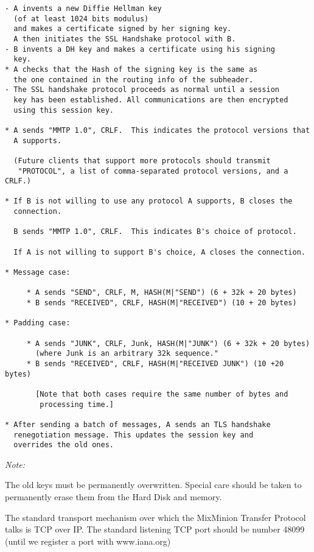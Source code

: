 \begin{verbatim}
- A invents a new Diffie Hellman key 
  (of at least 1024 bits modulus)
  and makes a certificate signed by her signing key.
  A then initiates the SSL Handshake protocol with B.
- B invents a DH key and makes a certificate using his signing
  key.
* A checks that the Hash of the signing key is the same as
  the one contained in the routing info of the subheader.
- The SSL handshake protocol proceeds as normal until a session
  key has been established. All communications are then encrypted
  using this session key.

* A sends "MMTP 1.0", CRLF.  This indicates the protocol versions that
  A supports.

  (Future clients that support more protocols should transmit
   "PROTOCOL", a list of comma-separated protocol versions, and a CRLF.)

* If B is not willing to use any protocol A supports, B closes the 
  connection.

  B sends "MMTP 1.0", CRLF.  This indicates B's choice of protocol.

  If A is not willing to support B's choice, A closes the connection.

* Message case:

     * A sends "SEND", CRLF, M, HASH(M|"SEND") (6 + 32k + 20 bytes)
     * B sends "RECEIVED", CRLF, HASH(M|"RECEIVED") (10 + 20 bytes)

* Padding case:

     * A sends "JUNK", CRLF, Junk, HASH(M|"JUNK") (6 + 32k + 20 bytes)
       (where Junk is an arbitrary 32k sequence."
     * B sends "RECEIVED", CRLF, HASH(M|"RECEIVED JUNK") (10 +20 bytes)

       [Note that both cases require the same number of bytes and 
        processing time.]

* After sending a batch of messages, A sends an TLS handshake
  renegotiation message. This updates the session key and
  overrides the old ones.

\end{verbatim}

\emph{Note:}

The old keys must be permanently overwritten. Special care should be
taken to permanently erase them from the Hard Disk and memory. 

The standard transport mechanism over which the MixMinion Transfer
Protocol talks is TCP over IP. The standard listening TCP port should be 
number 48099 (until we register a port with www.iana.org)

